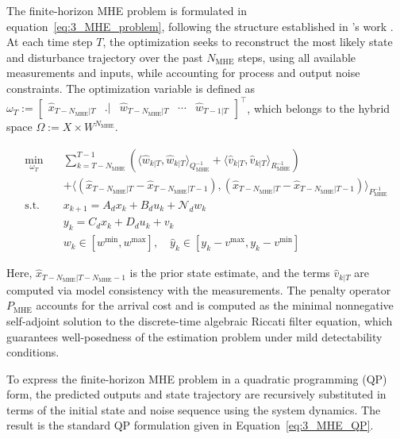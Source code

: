 The finite-horizon MHE problem is formulated in equation~\eqref{eq:3_MHE_problem}, following the structure established in 's work \autocite{xie2022constrained}. At each time step $T$, the optimization seeks to reconstruct the most likely state and disturbance trajectory over the past $N_{\mathrm{MHE}}$ steps, using all available measurements and inputs, while accounting for process and output noise constraints. The optimization variable is defined as $ \omega_T := \begin{bmatrix}\hat{x}_{T-N_{\mathrm{MHE}}|T} & \bigl. {} \bigr| & \hat{w}_{T-N_{\mathrm{MHE}}|T} & \cdots & \hat{w}_{T-1|T}\end{bmatrix}^\top$, which belongs to the hybrid space $\Omega := X \times W^{N_{\mathrm{MHE}}}$.

\begin{equation} \label{eq:3_MHE_problem}
\begin{aligned}
\min_{\omega_T} \quad & 
\sum_{k=T-N_{\mathrm{MHE}}}^{T-1} \left( \langle \hat{w}_{k|T}, \hat{w}_{k|T} \rangle_{Q_{\mathrm{MHE}}^{-1}} + \langle \hat{v}_{k|T}, \hat{v}_{k|T} \rangle_{R_{\mathrm{MHE}}^{-1}} \right) \\
&+ \langle (\hat{x}_{T{-}N_{\mathrm{MHE}}|T} - \hat{x}_{T{-}N_{\mathrm{MHE}}|T{-}1}), (\hat{x}_{T{-}N_{\mathrm{MHE}}|T} - \hat{x}_{T{-}N_{\mathrm{MHE}}|T{-}1}) \rangle_{P_{\mathrm{MHE}}^{-1}} \\
\text{s.t.} \quad
& x_{k+1} = A_d x_k + B_d u_k + \mathcal{N}_d w_k \\
& y_k = C_d x_k + D_d u_k + v_k \\
& w_k \in [w^{\min}, w^{\max}], \quad \hat{y}_k \in [y_k - v^{\max}, y_k - v^{\min}]
\end{aligned}
\end{equation}

Here, $\hat{x}_{T-N_{\mathrm{MHE}}|T-N_{\mathrm{MHE}}-1}$ is the prior state estimate, and the terms $\hat{v}_{k|T}$ are computed via model consistency with the measurements. The penalty operator $P_{\mathrm{MHE}}$ accounts for the arrival cost and is computed as the minimal nonnegative self-adjoint solution to the discrete-time algebraic Riccati filter equation\autocite{xie2022constrained}, which guarantees well-posedness of the estimation problem under mild detectability conditions.

To express the finite-horizon MHE problem in a quadratic programming (QP) form, the predicted outputs and state trajectory are recursively substituted in terms of the initial state and noise sequence using the system dynamics. The result is the standard QP formulation given in Equation~\ref{eq:3_MHE_QP}.

